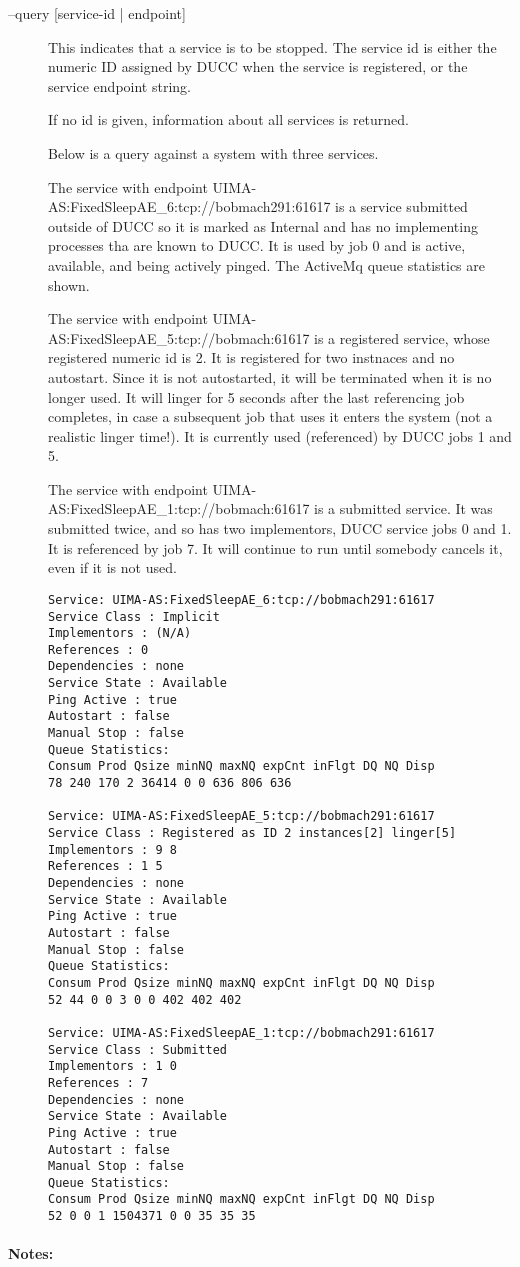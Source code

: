     \begin{description}
    \item[--query {[service-id | endpoint]}] This indicates that a service is to be stopped. The
      service id is either the numeric ID assigned by DUCC when the service is registered, or the
      service endpoint string.

      If no id is given, information about all services is returned. 

      Below is a query against a system with three services. 

      The service with endpoint UIMA-AS:FixedSleepAE\_6:tcp://bobmach291:61617 is a service 
      submitted outside of DUCC so it is marked as Internal and has no implementing processes 
      tha are known to DUCC. It is used by job 0 and is active, available, and being actively 
      pinged. The ActiveMq queue statistics are shown. 

      The service with endpoint UIMA-AS:FixedSleepAE\_5:tcp://bobmach:61617 is a 
      registered service, whose registered numeric id is 2. It is registered for two instnaces and 
      no autostart. Since it is not autostarted, it will be terminated when it is no longer used. It 
      will linger for 5 seconds after the last referencing job completes, in case a subsequent job 
      that uses it enters the system (not a realistic linger time!). It is currently used (referenced) 
      by DUCC jobs 1 and 5. 

      The service with endpoint UIMA-AS:FixedSleepAE\_1:tcp://bobmach:61617 is a 
      submitted service. It was submitted twice, and so has two implementors, DUCC service 
      jobs 0 and 1. It is referenced by job 7. It will continue to run until somebody cancels it, 
      even if it is not used. 

\begin{verbatim}
Service: UIMA-AS:FixedSleepAE_6:tcp://bobmach291:61617 
Service Class : Implicit 
Implementors : (N/A) 
References : 0 
Dependencies : none 
Service State : Available 
Ping Active : true 
Autostart : false 
Manual Stop : false 
Queue Statistics: 
Consum Prod Qsize minNQ maxNQ expCnt inFlgt DQ NQ Disp 
78 240 170 2 36414 0 0 636 806 636 

Service: UIMA-AS:FixedSleepAE_5:tcp://bobmach291:61617 
Service Class : Registered as ID 2 instances[2] linger[5] 
Implementors : 9 8 
References : 1 5 
Dependencies : none 
Service State : Available 
Ping Active : true 
Autostart : false 
Manual Stop : false 
Queue Statistics: 
Consum Prod Qsize minNQ maxNQ expCnt inFlgt DQ NQ Disp 
52 44 0 0 3 0 0 402 402 402 

Service: UIMA-AS:FixedSleepAE_1:tcp://bobmach291:61617 
Service Class : Submitted 
Implementors : 1 0 
References : 7 
Dependencies : none 
Service State : Available 
Ping Active : true 
Autostart : false 
Manual Stop : false 
Queue Statistics: 
Consum Prod Qsize minNQ maxNQ expCnt inFlgt DQ NQ Disp 
52 0 0 1 1504371 0 0 35 35 35 
\end{verbatim}
    \end{description}
    \paragraph{Notes:}

